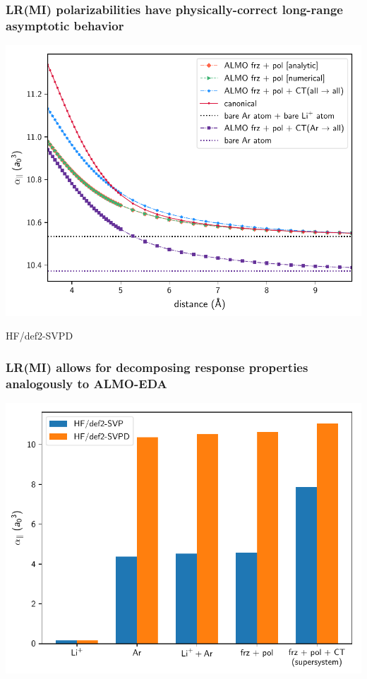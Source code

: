 \documentclass[%
    xcolor=usenames,dvipsnames,svgnames%
]{beamer}
\newenvironment{nscenter}
 {\parskip=0pt\par\nopagebreak\centering}
 {\par\noindent\ignorespacesafterend}
\begin{document}
\begin{frame}
  \frametitle{LR(MI) polarizabilities have physically-correct long-range asymptotic behavior}
  \begin{nscenter}
    \includegraphics[scale=0.65]{./figures/long_convergence_behavior_onaxis_def2-SVPD.pdf}
  \end{nscenter}
  {\tiny HF/def2-SVPD}
\end{frame}

\begin{frame}
  \frametitle{LR(MI) allows for decomposing response properties analogously to ALMO-EDA}
  \begin{nscenter}
    \includegraphics[scale=0.70]{./figures/bar_combined.pdf}
  \end{nscenter}
\end{frame}
\end{document}
